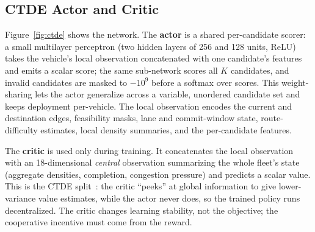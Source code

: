 \subsection{CTDE Actor and Critic}
Figure~\ref{fig:ctde} shows the network. The \textbf{actor} is a shared per-candidate
scorer: a small multilayer perceptron (two hidden layers of 256 and 128 units, ReLU)
takes the vehicle's local observation concatenated with one candidate's features and
emits a scalar score; the same sub-network scores all $K$ candidates, and invalid
candidates are masked to $-10^{9}$ before a softmax over scores. This weight-sharing lets
the actor generalize across a variable, unordered candidate set and keeps deployment
per-vehicle. The local observation encodes the current and destination edges, feasibility
masks, lane and commit-window state, route-difficulty estimates, local density summaries,
and the per-candidate features.

The \textbf{critic} is used only during training. It concatenates the local observation
with an 18-dimensional \emph{central} observation summarizing the whole fleet's state
(aggregate densities, completion, congestion pressure) and predicts a scalar value. This
is the CTDE split~\cite{lowe2017maddpg}: the critic ``peeks'' at global information to
give lower-variance value estimates, while the actor never does, so the trained policy
runs decentralized. The critic changes learning stability, not the objective; the
cooperative incentive must come from the reward.

